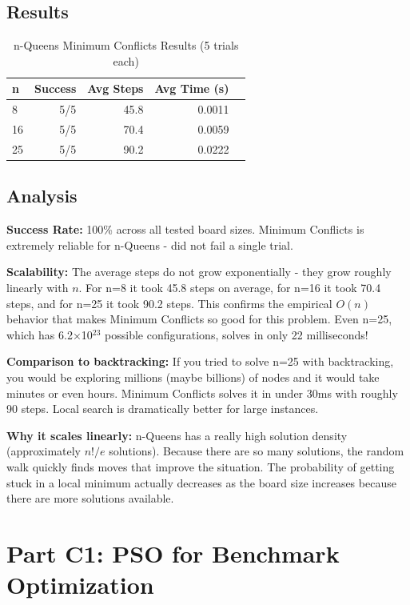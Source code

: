 \documentclass[letterpaper]{article}
\begin{document}
\subsection{Results}

\begin{table}[h]
\centering
\caption{n-Queens Minimum Conflicts Results (5 trials each)}
\label{tab:nqueens-results}
\begin{tabular}{@{}lrrrr@{}}
\toprule
\textbf{n} & \textbf{Success} & \textbf{Avg Steps} & \textbf{Avg Time (s)} \\
\midrule
8  & 5/5 & 45.8 & 0.0011 \\
16 & 5/5 & 70.4 & 0.0059 \\
25 & 5/5 & 90.2 & 0.0222 \\
\bottomrule
\end{tabular}
\end{table}

\subsection{Analysis}

\textbf{Success Rate:} 100\% across all tested board sizes. Minimum Conflicts is extremely reliable for n-Queens - did not fail a single trial.

\textbf{Scalability:} The average steps do not grow exponentially - they grow roughly linearly with $n$. For n=8 it took 45.8 steps on average, for n=16 it took 70.4 steps, and for n=25 it took 90.2 steps. This confirms the empirical $O(n)$ behavior that makes Minimum Conflicts so good for this problem. Even n=25, which has 6.2×10$^{23}$ possible configurations, solves in only 22 milliseconds!

\textbf{Comparison to backtracking:} If you tried to solve n=25 with backtracking, you would be exploring millions (maybe billions) of nodes and it would take minutes or even hours. Minimum Conflicts solves it in under 30ms with roughly 90 steps. Local search is dramatically better for large instances.

\textbf{Why it scales linearly:} n-Queens has a really high solution density (approximately $n!/e$ solutions). Because there are so many solutions, the random walk quickly finds moves that improve the situation. The probability of getting stuck in a local minimum actually decreases as the board size increases because there are more solutions available.

\section{Part C1: PSO for Benchmark Optimization}
\end{document}
